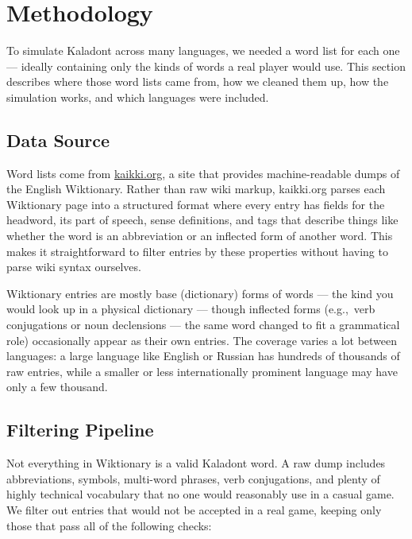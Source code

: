\section{Methodology}

To simulate Kaladont across many languages, we needed a word list for each one — ideally containing only the kinds of words a real player would use.
This section describes where those word lists came from, how we cleaned them up, how the simulation works, and which languages were included.

\subsection{Data Source}

Word lists come from \href{https://kaikki.org}{kaikki.org}, a site that provides machine-readable dumps of the English Wiktionary.
Rather than raw wiki markup, kaikki.org parses each Wiktionary page into a structured format where every entry has fields for the headword, its part of speech, sense definitions, and tags that describe things like whether the word is an abbreviation or an inflected form of another word.
This makes it straightforward to filter entries by these properties without having to parse wiki syntax ourselves.

Wiktionary entries are mostly base (dictionary) forms of words — the kind you would look up in a physical dictionary — though inflected forms (e.g.,\ verb conjugations or noun declensions — the same word changed to fit a grammatical role) occasionally appear as their own entries.
The coverage varies a lot between languages: a large language like English or Russian has hundreds of thousands of raw entries, while a smaller or less internationally prominent language may have only a few thousand.

\subsection{Filtering Pipeline}

Not everything in Wiktionary is a valid Kaladont word.
A raw dump includes abbreviations, symbols, multi-word phrases, verb conjugations, and plenty of highly technical vocabulary that no one would reasonably use in a casual game.
We filter out entries that would not be accepted in a real game, keeping only those that pass all of the following checks:

